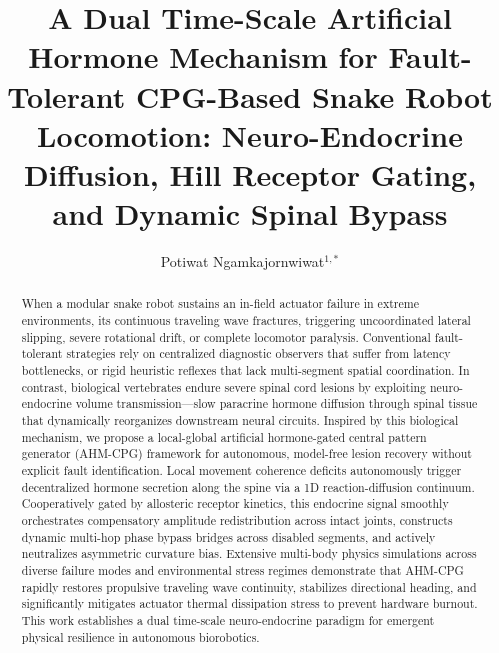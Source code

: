 \documentclass{iopjournal}
\begin{document}

\title{A Dual Time-Scale Artificial Hormone Mechanism for Fault-Tolerant CPG-Based Snake Robot Locomotion: Neuro-Endocrine Diffusion, Hill Receptor Gating, and Dynamic Spinal Bypass}

\author{Potiwat Ngamkajornwiwat$^{1,*}$}





\begin{abstract}
When a modular snake robot sustains an in-field actuator failure in extreme environments, its continuous traveling wave fractures, triggering uncoordinated lateral slipping, severe rotational drift, or complete locomotor paralysis. Conventional fault-tolerant strategies rely on centralized diagnostic observers that suffer from latency bottlenecks, or rigid heuristic reflexes that lack multi-segment spatial coordination. In contrast, biological vertebrates endure severe spinal cord lesions by exploiting neuro-endocrine volume transmission---slow paracrine hormone diffusion through spinal tissue that dynamically reorganizes downstream neural circuits. Inspired by this biological mechanism, we propose a local-global artificial hormone-gated central pattern generator (AHM-CPG) framework for autonomous, model-free lesion recovery without explicit fault identification. Local movement coherence deficits autonomously trigger decentralized hormone secretion along the spine via a 1D reaction-diffusion continuum. Cooperatively gated by allosteric receptor kinetics, this endocrine signal smoothly orchestrates compensatory amplitude redistribution across intact joints, constructs dynamic multi-hop phase bypass bridges across disabled segments, and actively neutralizes asymmetric curvature bias. Extensive multi-body physics simulations across diverse failure modes and environmental stress regimes demonstrate that AHM-CPG rapidly restores propulsive traveling wave continuity, stabilizes directional heading, and significantly mitigates actuator thermal dissipation stress to prevent hardware burnout. This work establishes a dual time-scale neuro-endocrine paradigm for emergent physical resilience in autonomous biorobotics.
\end{abstract}
\end{document}
